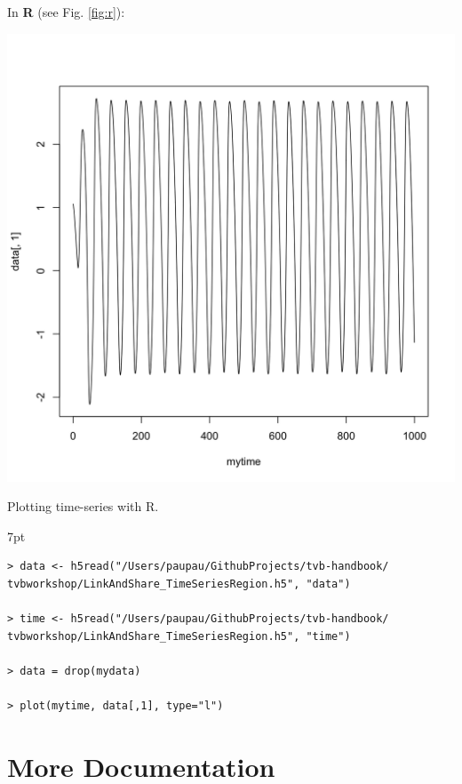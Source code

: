\documentclass{tufte-handout}
\newenvironment{blah}{%
  \def\FrameCommand{%
    \hspace{1pt}%
    {\color{DarkOrange}\vrule width 2pt}%
    {\color{PeachPuff}\vrule width 4pt}%
    \colorbox{PeachPuff}%
  }%
  \MakeFramed{\advance\hsize-\width\FrameRestore}%
  \noindent\hspace{-4.55pt}%
  \begin{adjustwidth}{}{7pt}%
  \vspace{2pt}\vspace{2pt}%
}
{%
  \vspace{2pt}\end{adjustwidth}\endMakeFramed%
}
\begin{document}
\newpage
In \textbf{R} (see Fig. \ref{fig:r}):
\begin{marginfigure}
  \includegraphics[width=\linewidth]{Handout_UI_LinkAndShare_RTimeSeriesRegion.png}%
  \caption{Plotting time-series with R.}%
  \label{fig:r}%
\end{marginfigure}

\begin{blah}
\begin{verbatim}
> data <- h5read("/Users/paupau/GithubProjects/tvb-handbook/
tvbworkshop/LinkAndShare_TimeSeriesRegion.h5", "data")

> time <- h5read("/Users/paupau/GithubProjects/tvb-handbook/
tvbworkshop/LinkAndShare_TimeSeriesRegion.h5", "time")

> data = drop(mydata)

> plot(mytime, data[,1], type="l")
\end{verbatim}
\end{blah}





\section{More Documentation}\label{sec:more-doc}
\end{document}
